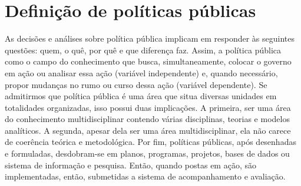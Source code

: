 \section{Definição de políticas públicas}


As decisões e análises sobre política pública implicam em responder às seguintes questões: quem, o quê, por quê e que diferença faz.
Assim, a política pública como o campo do conhecimento que busca, simultaneamente, colocar o governo em ação ou analisar essa ação (variável independente) e, quando necessário, propor mudanças no rumo ou curso dessa ação (variável dependente).
Se admitirmos que política pública é uma área que situa diversas unidades em totalidades organizadas, isso possui duas implicações. 
A primeira, ser uma área do conhecimento multidisciplinar contendo várias disciplinas, teorias e modelos analíticos.
A segunda, apesar dela ser uma área multidisciplinar, ela não carece de coerência teórica e metodológica.
Por fim, políticas públicas, após desenhadas e formuladas, desdobram-se em planos, programas, projetos, bases de dados ou sistema de informação e pesquisa. 
Então, quando postas em ação, são implementadas, então, submetidas a sistema de acompanhamento e avaliação.
